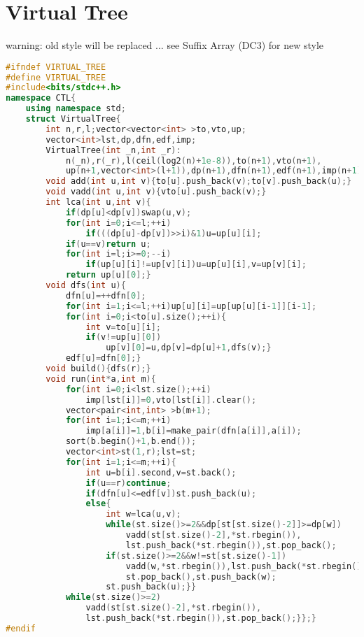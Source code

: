 \documentclass{book}
\begin{document}
\section{Virtual Tree}
warning: old style will be replaced ... see Suffix Array (DC3) for new style\begin{lstlisting}[language=C++,title={Virtual Tree.hpp (2352 bytes, 55 lines)}]
#ifndef VIRTUAL_TREE
#define VIRTUAL_TREE
#include<bits/stdc++.h>
namespace CTL{
    using namespace std;
    struct VirtualTree{
        int n,r,l;vector<vector<int> >to,vto,up;
        vector<int>lst,dp,dfn,edf,imp;
        VirtualTree(int _n,int _r):
            n(_n),r(_r),l(ceil(log2(n)+1e-8)),to(n+1),vto(n+1),
            up(n+1,vector<int>(l+1)),dp(n+1),dfn(n+1),edf(n+1),imp(n+1){}
        void add(int u,int v){to[u].push_back(v);to[v].push_back(u);}
        void vadd(int u,int v){vto[u].push_back(v);}
        int lca(int u,int v){
            if(dp[u]<dp[v])swap(u,v);
            for(int i=0;i<=l;++i)
                if(((dp[u]-dp[v])>>i)&1)u=up[u][i];
            if(u==v)return u;
            for(int i=l;i>=0;--i)
                if(up[u][i]!=up[v][i])u=up[u][i],v=up[v][i];
            return up[u][0];}
        void dfs(int u){
            dfn[u]=++dfn[0];
            for(int i=1;i<=l;++i)up[u][i]=up[up[u][i-1]][i-1];
            for(int i=0;i<to[u].size();++i){
                int v=to[u][i];
                if(v!=up[u][0])
                    up[v][0]=u,dp[v]=dp[u]+1,dfs(v);}
            edf[u]=dfn[0];}
        void build(){dfs(r);}
        void run(int*a,int m){
            for(int i=0;i<lst.size();++i)
                imp[lst[i]]=0,vto[lst[i]].clear();
            vector<pair<int,int> >b(m+1);
            for(int i=1;i<=m;++i)
                imp[a[i]]=1,b[i]=make_pair(dfn[a[i]],a[i]);
            sort(b.begin()+1,b.end());
            vector<int>st(1,r);lst=st;
            for(int i=1;i<=m;++i){
                int u=b[i].second,v=st.back();
                if(u==r)continue;
                if(dfn[u]<=edf[v])st.push_back(u);
                else{
                    int w=lca(u,v);
                    while(st.size()>=2&&dp[st[st.size()-2]]>=dp[w])
                        vadd(st[st.size()-2],*st.rbegin()),
                        lst.push_back(*st.rbegin()),st.pop_back();
                    if(st.size()>=2&&w!=st[st.size()-1])
                        vadd(w,*st.rbegin()),lst.push_back(*st.rbegin()),
                        st.pop_back(),st.push_back(w);
                    st.push_back(u);}}
            while(st.size()>=2)
                vadd(st[st.size()-2],*st.rbegin()),
                lst.push_back(*st.rbegin()),st.pop_back();}};}
#endif\end{lstlisting}
\end{document}
